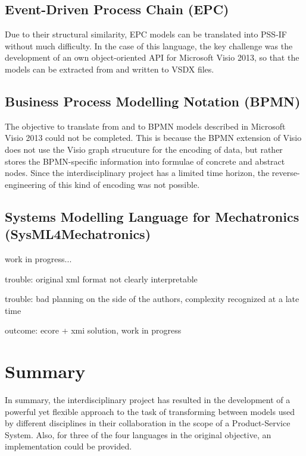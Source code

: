 \subsection{Event-Driven Process Chain (EPC)}

Due to their structural similarity, EPC models can be translated into PSS-IF without much difficulty. In the case of this language, the key challenge was the development of an own object-oriented API for Microsoft Visio 2013, so that the models can be extracted from and written to VSDX files.

\subsection{Business Process Modelling Notation (BPMN)}

The objective to translate from and to BPMN models described in Microsoft Visio 2013 could not be completed. This is because the BPMN extension of Visio does not use the Visio graph strucuture for the encoding of data, but rather stores the BPMN-specific information into formulae of concrete and abstract nodes. Since the interdisciplinary project has a limited time horizon, the reverse-engineering of this kind of encoding was not possible. 

\subsection{Systems Modelling Language for Mechatronics (SysML4Mechatronics)}

\color{red} work in progress...\color{black}

trouble: original xml format not clearly interpretable

trouble: bad planning on the side of the authors, complexity recognized at a late time

outcome: ecore + xmi solution, \color{red}work in progress\color{black}

\section{Summary}
\label{sec:results:summary}

In summary, the interdisciplinary project has resulted in the development of a powerful yet flexible approach to the task of transforming between models used by different disciplines in their collaboration in the scope of a Product-Service System. Also, for three of the four languages in the original objective, an implementation could be provided.